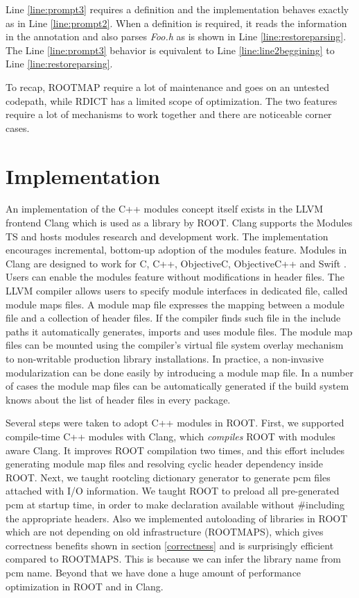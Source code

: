 \documentclass{webofc}
\begin{document}
Line \ref{line:prompt3} requires a definition and the implementation behaves exactly as in Line \ref{line:prompt2}. When a definition is required, it reads the information in the annotation and also parses {\it Foo.h} as is shown in Line \ref{line:restoreparsing}. The Line \ref{line:prompt3} behavior is equivalent to Line \ref{line:line2beggining} to Line \ref{line:restoreparsing}.

To recap, ROOTMAP require a lot of maintenance and goes on an untested codepath, while RDICT has a limited scope of optimization. The two features require a lot of mechanisms to work together and there are noticeable corner cases.

\section{Implementation}
\label{implementation}

An implementation of the C++ modules concept itself exists in the LLVM frontend Clang \cite{clang-modules-doc} which is used as a library by ROOT. Clang supports the Modules TS and hosts modules research and development work. The implementation encourages incremental, bottom-up adoption of the modules feature. Modules in Clang are designed to work for C, C++, ObjectiveC, ObjectiveC++ and Swift \cite{Moduralize-doc}. Users can enable the modules feature without modifications in header files. The LLVM compiler allows users to specify module interfaces in dedicated file, called module maps files. A module map file expresses the mapping between a module file and a collection of header files. If the compiler finds such file in the include paths it automatically generates, imports and uses module files. The module map files can be mounted using the compiler’s virtual file system overlay mechanism to non-writable production library installations. In practice, a non-invasive modularization can be done easily by introducing a module map file. In a number of cases the module map files can be automatically generated if the build system knows about the list of header files in every package.

Several steps were taken to adopt C++ modules in ROOT. First, we supported compile-time C++ modules with Clang, which {\it compiles} ROOT with modules aware Clang. It improves ROOT compilation two times, and this effort includes generating module map files and resolving cyclic header dependency inside ROOT. Next, we taught rootcling dictionary generator to generate pcm files attached with I/O information. We taught ROOT to preload all pre-generated pcm at startup time, in order to make declaration available without \#including the appropriate headers. Also we implemented autoloading of libraries in ROOT which are not depending on old infrastructure (ROOTMAPS), which gives correctness benefits shown in section \ref{correctness} and is surprisingly efficient compared to ROOTMAPS. This is because we can infer the library name from pcm name. Beyond that we have done a huge amount of performance optimization in ROOT and in Clang.
\end{document}
